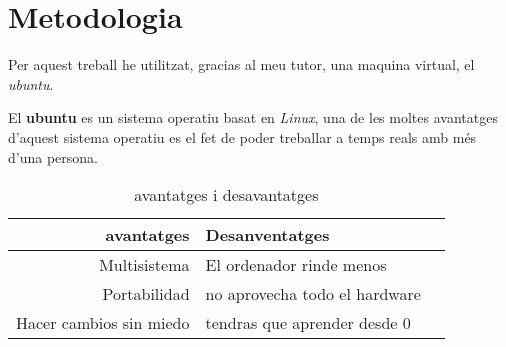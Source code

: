 \chapter{Metodologia}
Per aquest treball he utilitzat, gracias al meu tutor, una maquina virtual, el \textit{ubuntu}.
\vspace{0.3truecm}

El \textbf{ubuntu} es un sistema operatiu basat en \textit{Linux}, una de les moltes avantatges d'aquest sistema operatiu es el fet de poder treballar a temps reals amb més d'una persona.

\begin{table}[t]
\begin{center}
\begin{tabular}{| r | l | c |}
\hline avantatges & Desanventatges\\ \hline
Multisistema & El ordenador rinde menos \\
Portabilidad & no aprovecha todo el hardware \\
Hacer cambios sin miedo & tendras que aprender desde 0 \\ \hline
\end{tabular}
\caption{avantatges i desavantatges}
\label{tab:fruta}
\end{center}
\end{table}
